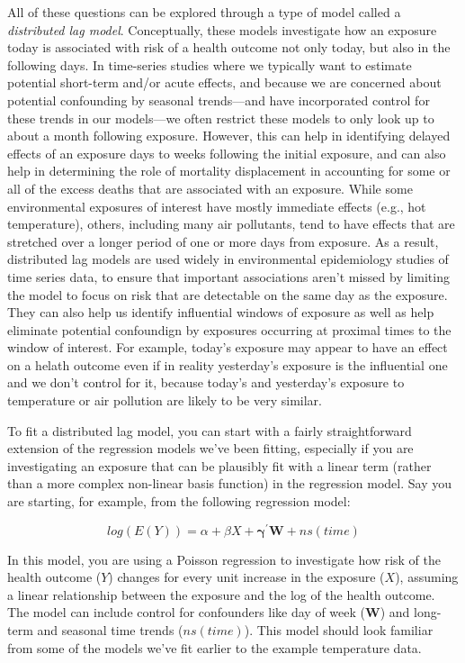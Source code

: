 \documentclass[
]{book}
\begin{document}
All of these questions can be explored through a type of model called a
\emph{distributed lag model}. Conceptually, these models investigate how an exposure
today is associated with risk of a health outcome not only today, but also in
the following days. In time-series studies where we typically want to estimate
potential short-term and/or acute effects, and because we are concerned about potential
confounding by seasonal trends---and have incorporated control for these trends in
our models---we often restrict these models to only look up to about a month following
exposure. However, this can help in identifying delayed effects of an exposure days to weeks
following the initial exposure, and can also help in determining the role of
mortality displacement in accounting for some or all of the excess deaths that are
associated with an exposure. While some environmental exposures of interest
have mostly immediate effects (e.g., hot temperature), others, including many air
pollutants, tend to have effects that are stretched over a longer period of one or
more days from exposure. As a result, distributed lag models are used widely in
environmental epidemiology studies of time series data, to ensure that important
associations aren't missed by limiting the model to focus on risk that are
detectable on the same day as the exposure. They can also help us identify influential
windows of exposure as well as help eliminate potential confoundign by exposures
occurring at proximal times to the window of interest. For example, today's exposure
may appear to have an effect on a helath outcome even if in reality yesterday's
exposure is the influential one and we don't control for it, because today's and
yesterday's exposure to temperature or air pollution are likely to be very similar.

To fit a distributed lag model, you can start with a fairly straightforward
extension of the regression models we've been fitting, especially if you are
investigating an exposure that can be plausibly fit with a linear term (rather than
a more complex non-linear basis function) in the regression model. Say you are starting,
for example, from the following regression model:

\[
log(E(Y)) = \alpha + \beta X + \mathbf{\gamma^{'}W} + ns(time)
\]

In this model, you are using a Poisson regression to investigate how risk of the
health outcome (\(Y\)) changes for every unit increase in the exposure (\(X\)), assuming
a linear relationship between the exposure and the log of the health outcome. The model
can include control for confounders like day of week (\(\mathbf{W}\)) and long-term and
seasonal time trends (\(ns(time)\)). This model should look familiar from some of the
models we've fit earlier to the example temperature data.
\end{document}

